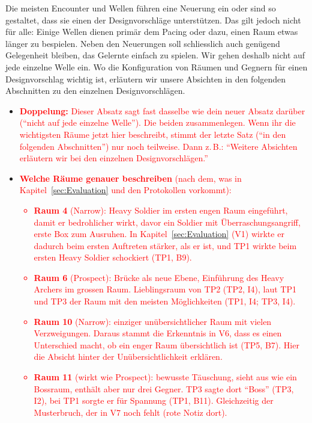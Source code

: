 \documentclass[../Main.tex]{subfiles}
\begin{document}
Die meisten Encounter und Wellen führen eine Neuerung ein oder sind so gestaltet, dass sie einen der Designvorschläge unterstützen. Das gilt jedoch nicht für alle: Einige Wellen dienen primär dem Pacing oder dazu, einen Raum etwas länger zu bespielen. Neben den Neuerungen soll schliesslich auch genügend Gelegenheit bleiben, das Gelernte einfach zu spielen. Wir gehen deshalb nicht auf jede einzelne Welle ein. Wo die Konfiguration von Räumen und Gegnern für einen Designvorschlag wichtig ist, erläutern wir unsere Absichten in den folgenden Abschnitten zu den einzelnen Designvorschlägen.

\begin{itemize}[leftmargin=1.5cm]
    \item \textcolor{red}{\textbf{Doppelung:} Dieser Absatz sagt fast dasselbe wie dein neuer Absatz darüber (\enquote{nicht auf jede einzelne Welle}). Die beiden zusammenlegen. Wenn ihr die wichtigsten Räume jetzt hier beschreibt, stimmt der letzte Satz (\enquote{in den folgenden Abschnitten}) nur noch teilweise. Dann z.\,B.: \enquote{Weitere Absichten erläutern wir bei den einzelnen Designvorschlägen.}}
    \item \textcolor{red}{\textbf{Welche Räume genauer beschreiben} (nach dem, was in Kapitel~\ref{sec:Evaluation} und den Protokollen vorkommt):
    \begin{itemize}
        \item \textbf{Raum 4} (Narrow): Heavy Soldier im ersten engen Raum eingeführt, damit er bedrohlicher wirkt, davor ein Soldier mit Überraschungsangriff, erste Box zum Ausruhen. In Kapitel~\ref{sec:Evaluation} (V1) wirkte er dadurch beim ersten Auftreten stärker, als er ist, und TP1 wirkte beim ersten Heavy Soldier schockiert (TP1, B9).
        \item \textbf{Raum 6} (Prospect): Brücke als neue Ebene, Einführung des Heavy Archers im grossen Raum. Lieblingsraum von TP2 (TP2, I4), laut TP1 und TP3 der Raum mit den meisten Möglichkeiten (TP1, I4; TP3, I4).
        \item \textbf{Raum 10} (Narrow): einziger unübersichtlicher Raum mit vielen Verzweigungen. Daraus stammt die Erkenntnis in V6, dass es einen Unterschied macht, ob ein enger Raum übersichtlich ist (TP5, B7). Hier die Absicht hinter der Unübersichtlichkeit erklären.
        \item \textbf{Raum 11} (wirkt wie Prospect): bewusste Täuschung, sieht aus wie ein Bossraum, enthält aber nur drei Gegner. TP3 sagte dort \enquote{Boss} (TP3, I2), bei TP1 sorgte er für Spannung (TP1, B11). Gleichzeitig der Musterbruch, der in V7 noch fehlt (rote Notiz dort).

\end{itemize}}
\end{itemize}
\end{document}
